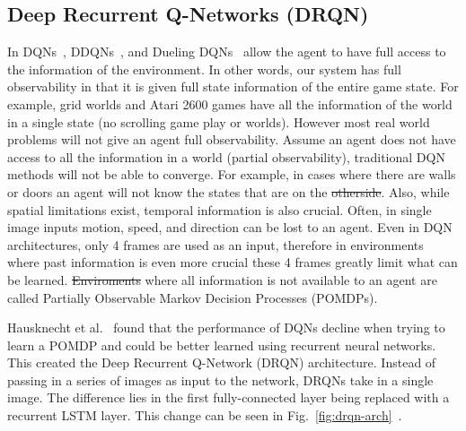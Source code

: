 \documentclass[12pt,american]{report}
\providecommand{\DIFaddtex}[1]{{\protect\color{blue}\uwave{#1}}} %
\providecommand{\DIFdeltex}[1]{{\protect\color{red}\sout{#1}}}                      %
\providecommand{\DIFaddbegin}{} %
\providecommand{\DIFaddend}{} %
\providecommand{\DIFdelbegin}{} %
\providecommand{\DIFdelend}{} %
\providecommand{\DIFadd}[1]{\texorpdfstring{\DIFaddtex{#1}}{#1}} %
\providecommand{\DIFdel}[1]{\texorpdfstring{\DIFdeltex{#1}}{}} %
\newcommand{\DIFscaledelfig}{0.5}
\newlength{\DIFdelgraphicswidth} %
\newlength{\DIFdelgraphicsheight} %
\newcommand{\DIFaddincludegraphics}[2][]{{\color{blue}\fbox{\DIFOincludegraphics[#1]{#2}}}} %
\newcommand{\DIFdelincludegraphics}[2][]{%
\sbox{\DIFdelgraphicsbox}{\DIFOincludegraphics[#1]{#2}}%
\settoboxwidth{\DIFdelgraphicswidth}{\DIFdelgraphicsbox} %
\settoboxtotalheight{\DIFdelgraphicsheight}{\DIFdelgraphicsbox} %
\scalebox{\DIFscaledelfig}{%
\parbox[b]{\DIFdelgraphicswidth}{\usebox{\DIFdelgraphicsbox}\\[-\baselineskip] \rule{\DIFdelgraphicswidth}{0em}}\llap{\resizebox{\DIFdelgraphicswidth}{\DIFdelgraphicsheight}{%
\setlength{\unitlength}{\DIFdelgraphicswidth}%
\begin{picture}(1,1)%
\thicklines\linethickness{2pt} %
{\color[rgb]{1,0,0}\put(0,0){\framebox(1,1){}}}%
{\color[rgb]{1,0,0}\put(0,0){\line( 1,1){1}}}%
{\color[rgb]{1,0,0}\put(0,1){\line(1,-1){1}}}%
\end{picture}%
}\hspace*{3pt}}} %
} %
\DeclareRobustCommand{\DIFaddbegin}{\DIFOaddbegin \let\includegraphics\DIFaddincludegraphics} %
\DeclareRobustCommand{\DIFaddend}{\DIFOaddend \let\includegraphics\DIFOincludegraphics} %
\DeclareRobustCommand{\DIFdelbegin}{\DIFOdelbegin \let\includegraphics\DIFdelincludegraphics} %
\DeclareRobustCommand{\DIFdelend}{\DIFOaddend \let\includegraphics\DIFOincludegraphics} %
\begin{document}
\subsection{Deep Recurrent Q-Networks (DRQN)}
In DQNs~\cite{atari}, DDQNs~\cite{van2016deep}, and Dueling DQNs~\cite{wang2015dueling} allow the agent to have full access to the information of the environment. In other words, our system has full observability in that it is given full state information of the entire game state.  For example, grid worlds and Atari 2600 games have all the information of the world in a single state (no scrolling game play or worlds). However most real world problems will not give an agent full observability. Assume an agent does not have access to all the information in a world (partial observability), traditional DQN methods will not be able to converge. For example, in cases where there are walls or doors an agent will not know the states that are on the \DIFdelbegin \DIFdel{otherside}\DIFdelend \DIFaddbegin \DIFadd{other side}\DIFaddend . Also, while spatial limitations exist, temporal information is also crucial.  Often, in single image inputs motion, speed, and direction can be lost to an agent. Even in DQN architectures, only 4 frames are used as an input, therefore in environments where past information is even more crucial these 4 frames greatly limit what can be learned. \DIFdelbegin \DIFdel{Enviroments }\DIFdelend \DIFaddbegin \DIFadd{Environments }\DIFaddend where all information is not available to an agent are called Partially Observable Markov Decision Processes (POMDPs).  

Hausknecht et al.~\cite{HausknechtDRQN} found that the performance of DQNs decline when trying to learn a POMDP and could be better learned using recurrent neural networks. This created the Deep Recurrent Q-Network (DRQN) architecture. Instead of passing in a series of images as input to the network, DRQNs take in a single image. The difference lies in the first fully-connected layer being replaced with a recurrent LSTM layer. This change can be seen in Fig.~\ref{fig:drqn-arch}~\cite{HausknechtDRQN}.
\end{document}
